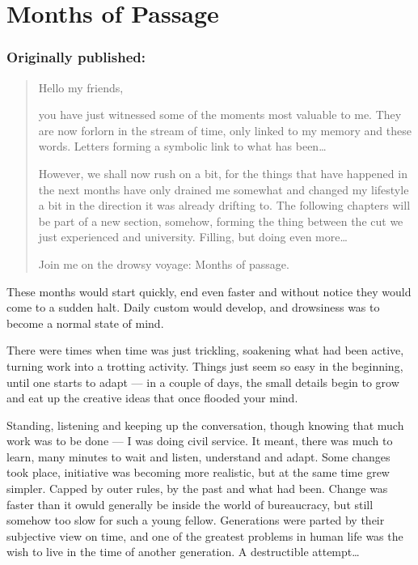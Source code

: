 \chapter{Months of Passage}
\label{cha:months-passage}
\subsection*{Originally published: }
\begin{quote}
Hello my friends, 

you have just witnessed some of the moments most valuable to me. They are now forlorn in the stream of time, only linked to my memory and these words. Letters forming a symbolic link to what has been\ldots

However, we shall now rush on a bit, for the things that have happened in the next months have only drained me somewhat and changed my lifestyle a bit in the direction it was already drifting to. The following chapters will be part of a new section, somehow, forming the thing between the cut we just experienced and university. Filling, but doing even more\ldots

Join me on the drowsy voyage: Months of passage.
\end{quote}

These months would start quickly, end even faster and without notice they would come to a sudden halt. Daily custom would develop, and drowsiness was to become a normal state of mind.

There were times when time was just trickling, soakening what had been active, turning work into a trotting activity. Things just seem so easy in the beginning, until one starts to adapt --- in a couple of days, the small details begin to grow and eat up the creative ideas that once flooded your mind.

Standing, listening and keeping up the conversation, though knowing that much work was to be done --- I was doing civil service. It meant, there was much to learn, many minutes to wait and listen, understand and adapt. Some changes took place, initiative was becoming more realistic, but at the same time grew simpler. Capped by outer rules, by the past and what had been. Change was faster than it owuld generally be inside the world of bureaucracy, but still somehow too slow for such a young fellow. Generations were parted by their subjective view on time, and one of the greatest problems in human life was the wish to live in the time of another generation. A destructible attempt\ldots

